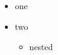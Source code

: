 \documentclass{article}
\begin{document}
\begin{itemize}
\item one
\item two
\begin{itemize}
\item nested
\end{itemize}
\end{itemize}
\end{document}
